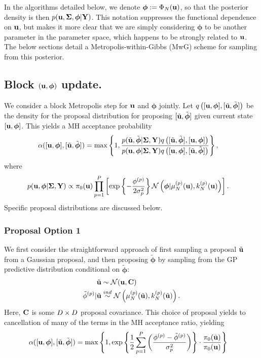 \documentclass[12pt]{article}
\newcommand{\bphi}{\boldsymbol{\phi}}
\begin{document}
In the algorithms detailed below, we denote $\bphi := \indexDesign[\Ndesign]{\SSR}(\bpar)$, so that the posterior density is then $p(\bpar, \CovObs, \bphi | \stateMat)$. This notation suppresses 
the functional dependence on $\mathbf{u}$, but makes it more clear that we are simply considering $\bphi$ to be another parameter in the parameter space, which happens to be strongly 
related to $\mathbf{u}$. The below sections detail a Metropolis-within-Gibbs (MwG) scheme for sampling from this posterior. 

\subsection{Block $(\bpar, \bphi)$ update.}
We consider a block Metropolis step for $\mathbf{u}$ and $\bphi$ jointly. Let $\propDens\left([\bpar, \bphi], [\tilde{\bpar}, \tilde{\bphi}] \right)$ be the density for the proposal distribution for 
proposing $[\tilde{\bpar}, \tilde{\bphi}]$ given current state $[\bpar, \bphi]$. This yields a MH acceptance probability
\begin{align*}
\accProbMH([\bpar, \bphi], [\tilde{\bpar}, \tilde{\bphi}]) 
&= \max\left\{1,  \frac{p(\tilde{\bpar}, \tilde{\bphi}|\CovObs, \stateMat)\propDens\left([\tilde{\bpar}, \tilde{\bphi}], [\bpar, \bphi] \right)}{p(\bpar, \bphi|\CovObs, \stateMat) \propDens\left([\bpar, \bphi], [\tilde{\bpar}, \tilde{\bphi}] \right)} \right\},
\end{align*}
where 
\begin{align*}
p(\bpar, \bphi|\CovObs, \stateMat) 
&\propto \priorDens(\bpar) \prod_{\objIdx=1}^{\Nobj} \left[\exp\left\{-\frac{\indexObj{\phi}}{2\sdObs^2_{\objIdx}} \right\} 
\Gaussian\left(\bphi | \GPMeanPredOut{\Ndesign}{\objIdx}(\bpar), \GPKerPredOut{\Ndesign}{\objIdx}(\bpar)\right) \right].
\end{align*}
Specific proposal distributions are discussed below. 

\subsubsection{Proposal Option 1}
We first consider the straightforward approach of first sampling a proposal $\tilde{\mathbf{u}}$ from a Gaussian proposal, and then proposing $\tilde{\bphi}$ by sampling from the 
GP predictive distribution conditional on $\tilde{\bphi}$: 
\begin{align*}
\tilde{\mathbf{u}} &\sim \mathcal{N}(\mathbf{u}, \mathbf{C}) \\
{\tilde{\phi}}^{(p)}|\tilde{\mathbf{u}} &\overset{ind}{\sim} \mathcal{N}\left(\mu_{N}^{(p)}(\tilde{\mathbf{u}}), k_{N}^{(p)}(\tilde{\mathbf{u}})\right).
\end{align*}
Here, $\mathbf{C}$ is some $D \times D$ proposal covariance. This choice of proposal yields to cancellation of many of the terms in the MH acceptance ratio, yielding
\begin{align*}
\accProbMH([\bpar, \bphi], [\tilde{\bpar}, \tilde{\bphi}]) 
&= \max\left\{1, \exp\left\{\frac{1}{2} \sum_{\objIdx=1}^{\Nobj} \left(\frac{ \indexObj{\phi} - \indexObj{\tilde{\phi}}}{\sdObs^2_{\objIdx}}\right)\right\} \cdot \frac{\priorDens(\tilde{\bpar})}{\priorDens(\bpar)} \right\}
\end{align*}
\end{document}
